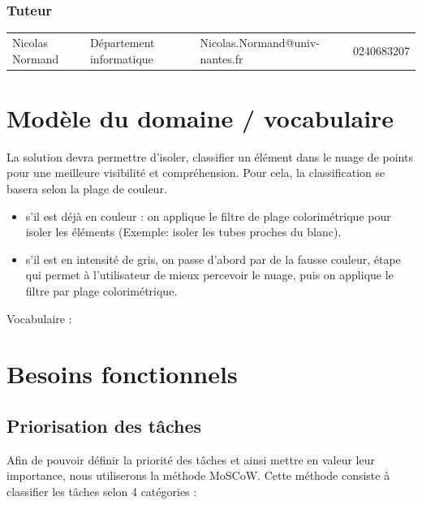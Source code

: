 \documentclass[12pt,titlepage,french]{article}
\begin{document}
\subsubsection*{Tuteur}

\noindent\begin{tabu} to \textwidth {X[c2]X[c2]X[c3]X[c]}\toprule
     &&                       &\\\toprule
Nicolas Normand& Département informatique&Nicolas.Normand@univ-nantes.fr&    0240683207\\\bottomrule
\end{tabu}

\section{Modèle du domaine / vocabulaire}

La solution devra permettre d’isoler, classifier un élément dans le nuage de points pour une meilleure visibilité et compréhension. Pour cela, la classification se basera selon la plage de couleur.
\begin{itemize}
	\item  s'il est déjà en couleur : on applique le filtre de plage colorimétrique pour isoler les éléments (Exemple: isoler les tubes proches du blanc).\par

	\item  s'il est en intensité de gris, on passe d'abord par de la fausse couleur, étape qui permet à l'utilisateur de mieux percevoir le nuage, puis on applique le filtre par plage colorimétrique.\par

\end{itemize}

Vocabulaire :


\section{Besoins fonctionnels}

\subsection*{Priorisation des tâches}

Afin de pouvoir définir la priorité des tâches et ainsi mettre en valeur leur importance, nous utiliserons la méthode MoSCoW. Cette méthode consiste à classifier les tâches selon 4 catégories :
\end{document}
